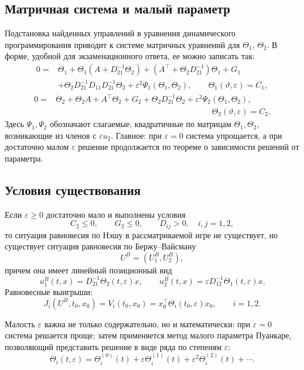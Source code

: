 \documentclass[12pt,a4paper]{article}
\begin{document}
\subsection*{Матричная система и малый параметр}
Подстановка найденных управлений в уравнения динамического программирования приводит к системе матричных уравнений для \(\Theta_1\), \(\Theta_2\). В форме, удобной для экзаменационного ответа, ее можно записать так:
\[
\begin{aligned}
0={}&\dot\Theta_1+
\Theta_1(A+D_{21}^{-1}\Theta_2)+(A^{\top}+\Theta_2D_{21}^{-1})\Theta_1+G_1 \\
&+\Theta_2D_{21}^{-1}D_{11}D_{21}^{-1}\Theta_2
+\varepsilon^2\Psi_1(\Theta_1,\Theta_2),
\qquad \Theta_1(\vartheta,\varepsilon)=C_1,
\end{aligned}
\]
\[
\begin{aligned}
0={}&\dot\Theta_2+
\Theta_2A+A^{\top}\Theta_2+G_2+\Theta_2D_{21}^{-1}\Theta_2
+\varepsilon^2\Psi_2(\Theta_1,\Theta_2),\\
&\hspace{8cm}\Theta_2(\vartheta,\varepsilon)=C_2.
\end{aligned}
\]
Здесь \(\Psi_1,\Psi_2\) обозначают слагаемые, квадратичные по матрицам \(\Theta_1,\Theta_2\), возникающие из членов с \(\varepsilon u_2\). Главное: при \(\varepsilon=0\) система упрощается, а при достаточно малом \(\varepsilon\) решение продолжается по теореме о зависимости решений от параметра.

\subsection*{Условия существования}
Если \(\varepsilon\ge 0\) достаточно мало и выполнены условия
\[
C_2\le 0,
\qquad G_2\le 0,
\qquad D_{ij}>0,
\quad i,j=1,2,
\]
то ситуация равновесия по Нэшу в рассматриваемой игре не существует, но существует ситуация равновесия по Бержу--Вайсману
\[
U^B=(U_1^B,U_2^B),
\]
причем она имеет линейный позиционный вид
\[
u_1^B(t,x)=D_{21}^{-1}\Theta_2(t,\varepsilon)x,
\qquad
u_2^B(t,x)=\varepsilon D_{12}^{-1}\Theta_1(t,\varepsilon)x.
\]
Равновесные выигрыши:
\[
J_i(U^B,t_0,x_0)=V_i(t_0,x_0)=x_0^{\top}\Theta_i(t_0,\varepsilon)x_0,
\qquad i=1,2.
\]

Малость \(\varepsilon\) важна не только содержательно, но и математически: при \(\varepsilon=0\) система решается проще; затем применяется метод малого параметра Пуанкаре, позволяющий представить решение в виде ряда по степеням \(\varepsilon\):
\[
\Theta_i(t,\varepsilon)=\Theta_i^{(0)}(t)+\varepsilon\Theta_i^{(1)}(t)+\varepsilon^2\Theta_i^{(2)}(t)+\cdots .
\]
\end{document}
